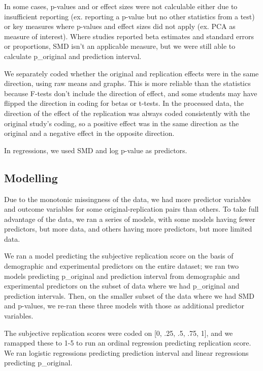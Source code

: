 \documentclass[
  english,
  a4paper,
]{article}
\begin{document}
In some cases, p-values and or effect sizes were not calculable either due to insufficient reporting (ex. reporting a p-value but no other statistics from a test) or key measures where p-values and effect sizes did not apply (ex. PCA as measure of interest). Where studies reported beta estimates and standard errors or proportions, SMD isn't an applicable measure, but we were still able to calculate p\_original and prediction interval.

We separately coded whether the original and replication effects were in the same direction, using raw means and graphs. This is more reliable than the statistics because F-tests don't include the direction of effect, and some students may have flipped the direction in coding for betas or t-tests. In the processed data, the direction of the effect of the replication was always coded consistently with the original study's coding, so a positive effect was in the same direction as the original and a negative effect in the opposite direction.

In regressions, we used SMD and log p-value as predictors.

\hypertarget{modelling}{%
\subsection{Modelling}\label{modelling}}

Due to the monotonic missingness of the data, we had more predictor variables and outcome variables for some original-replication pairs than others. To take full advantage of the data, we ran a series of models, with some models having fewer predictors, but more data, and others having more predictors, but more limited data.

We ran a model predicting the subjective replication score on the basis of demographic and experimental predictors on the entire dataset; we ran two models predicting p\_original and prediction interval from demographic and experimental predictors on the subset of data where we had p\_original and prediction intervals. Then, on the smaller subset of the data where we had SMD and p-values, we re-ran these three models with those as additional predictor variables.

The subjective replication scores were coded on {[}0, .25, .5, .75, 1{]}, and we ramapped these to 1-5 to run an ordinal regression predicting replication score. We ran logistic regressions predicting prediction interval and linear regressions predicting p\_original.
\end{document}
